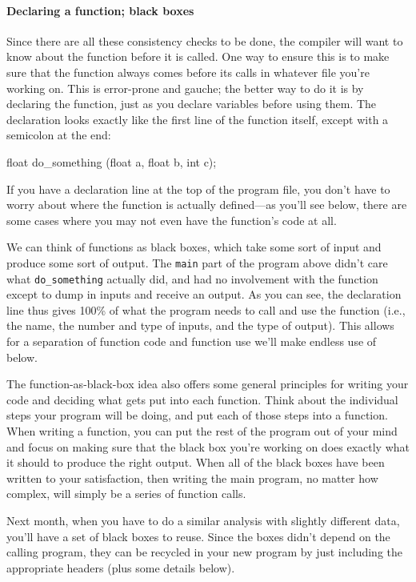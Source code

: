 \documentclass[12pt]{article}
\begin{document}
\paragraph{Declaring a function; black boxes} 
Since there are all these consistency
checks to be done, the compiler will want to know about the function
before it is called. One way to ensure this is to make sure that
the function always comes before its calls in whatever file you're
working on. This is error-prone and gauche; the better way to do it is
by declaring the function, just as you declare variables before using
them. The declaration looks exactly like the first line of the function
itself, except with a semicolon at the end:

float do_something (float a, float b, int c);

If you have a declaration line at the top of the program file, you don't
have to worry about where the function is actually defined---as
you'll see below, there are some cases where you may not even have the
function's code at all. 

We can think of functions as black boxes, which take some sort of input and produce some sort of output.
The {\tt main} part of the program above didn't care what {\tt do\_something} actually did, and had no
involvement with the function except to dump in inputs and receive an output. As you can see, the
declaration line thus gives 100\% of what the program needs to call and use the function (i.e., the name,
the number and type of inputs, and the type of output). This allows for
a separation of function code and function use we'll make endless use of below.

The function-as-black-box idea also offers some general principles for
writing your code and deciding what gets put into each function. Think
about the individual steps your program will be doing, and put each
of those steps into a function. When writing a function, you
can put the rest of the program out of your mind and focus on making
sure that the black box you're working on does exactly what it should
to produce the right output. When all of the black boxes have been written to
your satisfaction, then writing the main program, no matter how complex,
will simply be a series of function calls.

Next month, when you have to do a similar analysis with slightly different
data, you'll have a set of black boxes to reuse. Since the boxes didn't
depend on the calling program, they can be recycled in your new program
by just including the appropriate headers (plus some details below).
\end{document}
